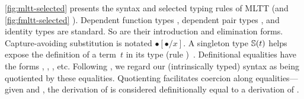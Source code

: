 \cref{fig:mltt-selected} presents the syntax and selected typing rules of MLTT %
(and \cref{fig:fmltt-selected} \TT).
Dependent function types ,
dependent pair types , and
identity types  are standard.
So are their introduction and elimination forms.
Capture-avoiding substitution is notated $\bullet[\bullet/x]$.
A singleton type $\mathbb{S}({t})$ helps expose the definition of a term~$t$
in its type (rule )~\cite{aspinall1995singleton,stone2000}.
Definitional equalities have the forms %
,
,
,
etc.
Following \citet{altkap2016}, we regard our (intrinsically typed) syntax
as being quotiented by these equalities.
Quotienting facilitates coercion along equalities---given
 and
,
the derivation of  is considered definitionally equal to
a derivation of .

